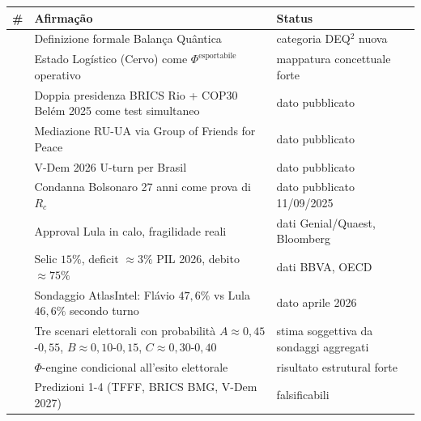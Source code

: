 {\def\LTcaptype{none} %
{\small\begin{longtable}[]{@{}
  >{\raggedright\arraybackslash}p{}
  >{\raggedright\arraybackslash}p{}
  >{\raggedright\arraybackslash}p{}@{}}
\toprule\noalign{}
\begin{minipage}[b]{\linewidth}\raggedright
\#
\end{minipage} & \begin{minipage}[b]{\linewidth}\raggedright
Afirmação
\end{minipage} & \begin{minipage}[b]{\linewidth}\raggedright
Status
\end{minipage} \\
\midrule\noalign{}
\endhead
\bottomrule\noalign{}
\endlastfoot
1 & Definizione formale Balança Quântica & \Hypoth{} categoria
DEQ$^2$ nuova \\
2 & Estado Logístico (Cervo) come \(\Phi^{\text{esportabile}}\)
operativo & \Hypoth{} mappatura concettuale forte \\
3 & Doppia presidenza BRICS Rio + COP30 Belém 2025 come test simultaneo
& \Proved{} dato pubblicato \\
4 & Mediazione RU-UA via Group of Friends for Peace & \Proved{} dato
pubblicato \\
5 & V-Dem 2026 U-turn per Brasil & \Proved{} dato pubblicato \\
6 & Condanna Bolsonaro 27 anni come prova di \(R_c\) & \Proved{} dato
pubblicato 11/09/2025 \\
7 & Approval Lula in calo, fragilidade reali & \Proved{} dati
Genial/Quaest, Bloomberg \\
8 & Selic \(15\%\), deficit \(\approx 3\%\) PIL 2026, debito
\(\approx 75\%\) & \Proved{} dati BBVA, OECD \\
9 & Sondaggio AtlasIntel: Flávio \(47{,}6\%\) vs Lula \(46{,}6\%\)
secondo turno & \Proved{} dato aprile 2026 \\
10 & Tre scenari elettorali con probabilità
\(A \approx 0{,}45\)-\(0{,}55\), \(B \approx 0{,}10\)-\(0{,}15\),
\(C \approx 0{,}30\)-\(0{,}40\) & \Conj{} stima soggettiva da sondaggi
aggregati \\
11 & \(\Phi\)-engine condicional all'esito elettorale & \Hypoth{}
risultato estrutural forte \\
12 & Predizioni 1-4 (TFFF, BRICS BMG, V-Dem 2027) & \Conj{}
falsificabili \\
\end{longtable}}
}



